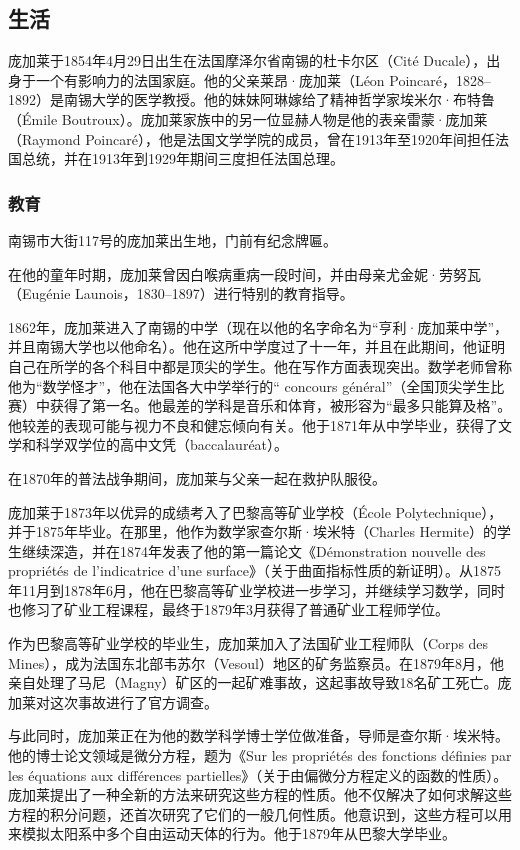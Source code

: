\subsection{生活}
庞加莱于1854年4月29日出生在法国摩泽尔省南锡的杜卡尔区（Cité Ducale），出身于一个有影响力的法国家庭。他的父亲莱昂·庞加莱（Léon Poincaré，1828–1892）是南锡大学的医学教授。他的妹妹阿琳嫁给了精神哲学家埃米尔·布特鲁（Émile Boutroux）。庞加莱家族中的另一位显赫人物是他的表亲雷蒙·庞加莱（Raymond Poincaré），他是法国文学学院的成员，曾在1913年至1920年间担任法国总统，并在1913年到1929年期间三度担任法国总理。
\subsubsection{教育}

南锡市大街117号的庞加莱出生地，门前有纪念牌匾。

在他的童年时期，庞加莱曾因白喉病重病一段时间，并由母亲尤金妮·劳努瓦（Eugénie Launois，1830–1897）进行特别的教育指导。

1862年，庞加莱进入了南锡的中学（现在以他的名字命名为“亨利·庞加莱中学”，并且南锡大学也以他命名）。他在这所中学度过了十一年，并且在此期间，他证明自己在所学的各个科目中都是顶尖的学生。他在写作方面表现突出。数学老师曾称他为“数学怪才”，他在法国各大中学举行的“ concours général”（全国顶尖学生比赛）中获得了第一名。他最差的学科是音乐和体育，被形容为“最多只能算及格”。他较差的表现可能与视力不良和健忘倾向有关。他于1871年从中学毕业，获得了文学和科学双学位的高中文凭（baccalauréat）。

在1870年的普法战争期间，庞加莱与父亲一起在救护队服役。

庞加莱于1873年以优异的成绩考入了巴黎高等矿业学校（École Polytechnique），并于1875年毕业。在那里，他作为数学家查尔斯·埃米特（Charles Hermite）的学生继续深造，并在1874年发表了他的第一篇论文《Démonstration nouvelle des propriétés de l'indicatrice d'une surface》（关于曲面指标性质的新证明）。从1875年11月到1878年6月，他在巴黎高等矿业学校进一步学习，并继续学习数学，同时也修习了矿业工程课程，最终于1879年3月获得了普通矿业工程师学位。

作为巴黎高等矿业学校的毕业生，庞加莱加入了法国矿业工程师队（Corps des Mines），成为法国东北部韦苏尔（Vesoul）地区的矿务监察员。在1879年8月，他亲自处理了马尼（Magny）矿区的一起矿难事故，这起事故导致18名矿工死亡。庞加莱对这次事故进行了官方调查。

与此同时，庞加莱正在为他的数学科学博士学位做准备，导师是查尔斯·埃米特。他的博士论文领域是微分方程，题为《Sur les propriétés des fonctions définies par les équations aux différences partielles》（关于由偏微分方程定义的函数的性质）。庞加莱提出了一种全新的方法来研究这些方程的性质。他不仅解决了如何求解这些方程的积分问题，还首次研究了它们的一般几何性质。他意识到，这些方程可以用来模拟太阳系中多个自由运动天体的行为。他于1879年从巴黎大学毕业。
